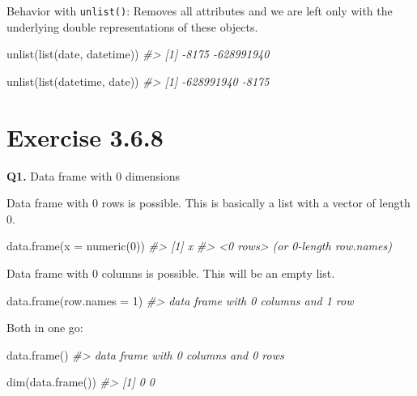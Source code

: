 \documentclass[
]{book}
\newenvironment{Shaded}{\begin{snugshade}}{\end{snugshade}}
\newcommand{\AttributeTok}[1]{\textcolor[rgb]{0.77,0.63,0.00}{#1}}
\newcommand{\CommentTok}[1]{\textcolor[rgb]{0.56,0.35,0.01}{\textit{#1}}}
\newcommand{\DecValTok}[1]{\textcolor[rgb]{0.00,0.00,0.81}{#1}}
\newcommand{\FunctionTok}[1]{\textcolor[rgb]{0.00,0.00,0.00}{#1}}
\newcommand{\NormalTok}[1]{#1}
\begin{document}
Behavior with \texttt{unlist()}: Removes all attributes and we are left only with the underlying double representations of these objects.

\begin{Shaded}
\begin{Highlighting}[]
\FunctionTok{unlist}\NormalTok{(}\FunctionTok{list}\NormalTok{(date, datetime))}
\CommentTok{\#\textgreater{} [1]      {-}8175 {-}628991940}

\FunctionTok{unlist}\NormalTok{(}\FunctionTok{list}\NormalTok{(datetime, date))}
\CommentTok{\#\textgreater{} [1] {-}628991940      {-}8175}
\end{Highlighting}
\end{Shaded}

\hypertarget{exercise-3.6.8}{%
\section{Exercise 3.6.8}\label{exercise-3.6.8}}

\textbf{Q1.} Data frame with 0 dimensions

Data frame with 0 rows is possible. This is basically a list with a vector of length 0.

\begin{Shaded}
\begin{Highlighting}[]
\FunctionTok{data.frame}\NormalTok{(}\AttributeTok{x =} \FunctionTok{numeric}\NormalTok{(}\DecValTok{0}\NormalTok{))}
\CommentTok{\#\textgreater{} [1] x}
\CommentTok{\#\textgreater{} \textless{}0 rows\textgreater{} (or 0{-}length row.names)}
\end{Highlighting}
\end{Shaded}

Data frame with 0 columns is possible. This will be an empty list.

\begin{Shaded}
\begin{Highlighting}[]
\FunctionTok{data.frame}\NormalTok{(}\AttributeTok{row.names =} \DecValTok{1}\NormalTok{)}
\CommentTok{\#\textgreater{} data frame with 0 columns and 1 row}
\end{Highlighting}
\end{Shaded}

Both in one go:

\begin{Shaded}
\begin{Highlighting}[]
\FunctionTok{data.frame}\NormalTok{()}
\CommentTok{\#\textgreater{} data frame with 0 columns and 0 rows}

\FunctionTok{dim}\NormalTok{(}\FunctionTok{data.frame}\NormalTok{())}
\CommentTok{\#\textgreater{} [1] 0 0}
\end{Highlighting}
\end{Shaded}
\end{document}
